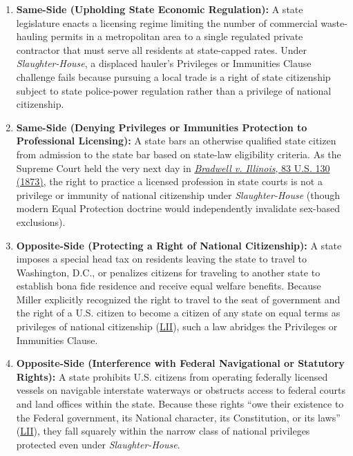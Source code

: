 \documentclass[12pt]{article}
\begin{document}
\begin{enumerate}
  \item \textbf{Same-Side (Upholding State Economic Regulation):} A state legislature enacts a licensing regime limiting the number of commercial waste-hauling permits in a metropolitan area to a single regulated private contractor that must serve all residents at state-capped rates. Under \textit{Slaughter-House}, a displaced hauler's Privileges or Immunities Clause challenge fails because pursuing a local trade is a right of state citizenship subject to state police-power regulation rather than a privilege of national citizenship.
  \item \textbf{Same-Side (Denying Privileges or Immunities Protection to Professional Licensing):} A state bars an otherwise qualified state citizen from admission to the state bar based on state-law eligibility criteria. As the Supreme Court held the very next day in \href{https://supreme.justia.com/cases/federal/us/83/130/}{\textit{Bradwell v. Illinois}, 83 U.S. 130 (1873)}, the right to practice a licensed profession in state courts is not a privilege or immunity of national citizenship under \textit{Slaughter-House} (though modern Equal Protection doctrine would independently invalidate sex-based exclusions).
  \item \textbf{Opposite-Side (Protecting a Right of National Citizenship):} A state imposes a special head tax on residents leaving the state to travel to Washington, D.C., or penalizes citizens for traveling to another state to establish bona fide residence and receive equal welfare benefits. Because Miller explicitly recognized the right to travel to the seat of government and the right of a U.S. citizen to become a citizen of any state on equal terms as privileges of national citizenship (\href{https://www.law.cornell.edu/supremecourt/text/83/36}{LII}), such a law abridges the Privileges or Immunities Clause.
  \item \textbf{Opposite-Side (Interference with Federal Navigational or Statutory Rights):} A state prohibits U.S. citizens from operating federally licensed vessels on navigable interstate waterways or obstructs access to federal courts and land offices within the state. Because these rights ``owe their existence to the Federal government, its National character, its Constitution, or its laws'' (\href{https://www.law.cornell.edu/supremecourt/text/83/36}{LII}), they fall squarely within the narrow class of national privileges protected even under \textit{Slaughter-House}.

\end{enumerate}
\end{document}
